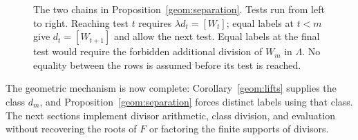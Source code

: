 \begin{figure}[htbp]
\centering
{}
\caption{The two chains in Proposition~\ref{geom:separation}.
Tests run from left to right.  Reaching test $t$ requires
$\lambda d_t=[W_t]$; equal labels at $t<m$ give
$d_t=[W_{t+1}]$ and allow the next test.  Equal labels at the final test
would require the forbidden additional division of $W_m$ in $\Lambda$.
No equality between the rows is assumed before its test is reached.}
\label{geom:ladder}
\end{figure}

The geometric mechanism is now complete: Corollary~\ref{geom:lifts}
supplies the class $d_m$, and Proposition~\ref{geom:separation} forces
distinct labels using that class.  The next sections implement divisor
arithmetic, class division, and evaluation without recovering the roots
of $F$ or factoring the finite supports of divisors.
